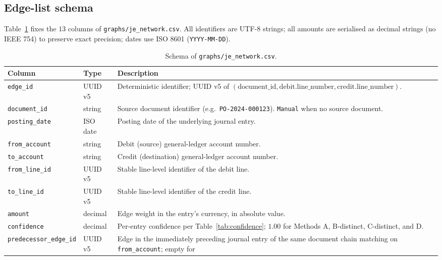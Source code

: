 \subsection{Edge-list schema}
\label{sec:graph:schema}

Table~\ref{tab:graph:schema} fixes the $13$ columns of
\texttt{graphs/je\_network.csv}.  All identifiers are UTF-8 strings;
all amounts are serialised as decimal strings (no IEEE 754) to
preserve exact precision; dates use ISO 8601 (\texttt{YYYY-MM-DD}).

\begin{table}[H]
  \centering
  \caption{Schema of \texttt{graphs/je\_network.csv}.}
  \label{tab:graph:schema}
  \small
  \begin{tabular}{p{1.6cm}p{2.5cm}p{8.0cm}}
    \toprule
    \textbf{Column} & \textbf{Type} & \textbf{Description}\\
    \midrule
    \texttt{edge\_id}            & UUID v5  &
      Deterministic identifier; UUID v5 of
      $(\text{document\_id}, \text{debit.line\_number},
        \text{credit.line\_number})$.\\
    \texttt{document\_id}        & string   &
      Source document identifier
      (e.g.\ \texttt{PO-2024-000123}).  \texttt{Manual} when no
      source document.\\
    \texttt{posting\_date}       & ISO date &
      Posting date of the underlying journal entry.\\
    \texttt{from\_account}       & string   &
      Debit (source) general-ledger account number.\\
    \texttt{to\_account}         & string   &
      Credit (destination) general-ledger account number.\\
    \texttt{from\_line\_id}      & UUID v5  &
      Stable line-level identifier of the debit line.\\
    \texttt{to\_line\_id}        & UUID v5  &
      Stable line-level identifier of the credit line.\\
    \texttt{amount}              & decimal  &
      Edge weight in the entry's currency, in absolute value.\\
    \texttt{confidence}          & decimal  &
      Per-entry confidence per Table~\ref{tab:confidence};
      $1.00$ for Methods A, B-distinct, C-distinct, and D.\\
    \texttt{predecessor\_edge\_id} & UUID v5 &
      Edge in the immediately preceding journal entry of the same
      document chain matching on \texttt{from\_account}; empty for

\end{tabular}
\end{table}
